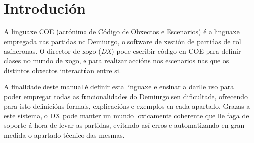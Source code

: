 \chapter{Introdución}
A linguaxe COE (acrónimo de Código de Obxectos e Escenarios) é a linguaxe
empregada nas partidas no Demiurgo, o software de xestión de
partidas de rol asíncronas. O director de xogo ({\it DX}) pode escribir código
en COE para definir clases no mundo de xogo, e para realizar accións nos escenarios nas que
os distintos obxectos interactúan entre si.
\par
A finalidade deste manual é definir esta linguaxe e ensinar a darlle uso para
poder empregar todas as funcionalidades do Demiurgo sen dificultade, ofrecendo
para isto definicións formais, explicacións e exemplos en cada apartado. Grazas
a este sistema, o DX pode manter un mundo loxicamente coherente que lle faga de
soporte á hora de levar as partidas, evitando así erros e automatizando en gran
medida o apartado técnico das mesmas.